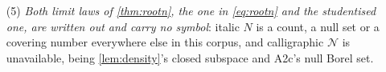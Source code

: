 \begin{remark}
\begin{enumerate}
{this object}: $\vartheta'\psi$ is the moment for $\vartheta'\theta_\dagger$. It is \textbf{not}
$\varkappa$, which is a local bound variable in \eqref{eq:jackson}, nor $\mathsf r$, which is the
$\varrho$-direction.
\item[(5)] \emph{Both limit laws of \cref{thm:rootn}, the one in \eqref{eq:rootn} and the studentised
one, are written out and carry no symbol}: italic $N$ is a count, a null set or a covering number
everywhere else in this corpus, and calligraphic $\mathcal N$ is unavailable, being \cref{lem:density}'s
closed subspace and A2c's null Borel set.
\end{enumerate}
\end{remark}

